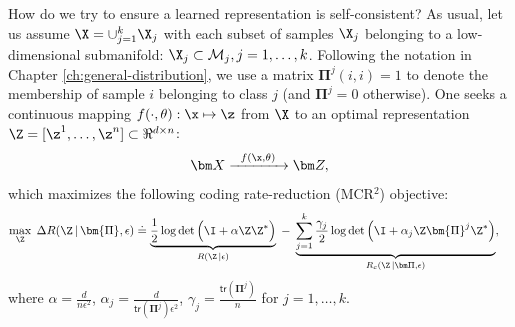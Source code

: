 \documentclass[../../book-main.tex]{subfiles}
\begin{document}
How do we try to ensure a learned representation is self-consistent? As usual, let us assume $\X = \cup_{j=1}^k \X_j$ with each subset of samples $\X_j$ belonging to a low-dimensional submanifold: $\X_j \subset \mathcal{M}_j, j = 1,\ldots, k$. Following the notation in Chapter \ref{ch:general-distribution}, we use a matrix $\bm \Pi^j(i,i) = 1$ to denote the membership of sample $i$ belonging to class $j$ (and $\bm \Pi^j = 0$ otherwise). One seeks a continuous mapping $f(\cdot,\theta): \x \mapsto \z$ from $\X$ to an optimal representation $\Z = [\z^1, \ldots, \z^n] \subset \Re^{d \times n}$:
\begin{equation}
\bm X  \xrightarrow{\hspace{2mm} f(\x, \theta)\hspace{2mm}} \bm Z, 
\label{eqn:LDR}
\end{equation}
which maximizes the following coding rate-reduction (MCR$^2$) objective:
\begin{equation}\label{eq:mcr2-formulation}
\begin{split}
\max_{\Z} \; \Delta R(\Z\, | \, \bm{\Pi}, \epsilon) %
&\doteq \underbrace{\frac{1}{2}\log\det \Big(\I + {\alpha} \Z \Z^{*} \Big)}_{R(\Z\, | \epsilon)} \;-\; \underbrace{\sum_{j=1}^{k}\frac{\gamma_j}{2} \log\det\Big(\I + {\alpha_j} \Z \bm{\Pi}^{j} \Z^{*} \Big)}_{R_c(\Z \,|\bm \Pi, \epsilon)},
\end{split}
\end{equation}
where $\alpha=\frac{d}{n\epsilon^2}$, $\alpha_j=\frac{d}{\textsf{tr}(\bm{\Pi}^{j})\epsilon^2}$, $\gamma_j=\frac{\textsf{tr}(\bm{\Pi}^{j})}{n}$ for $j = 1,\ldots, k$.
\end{document}
